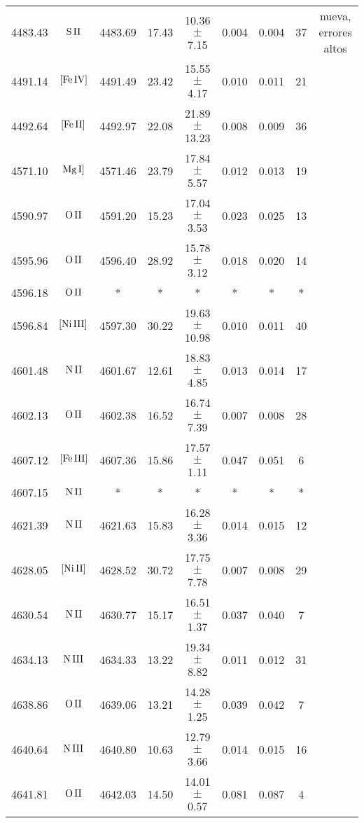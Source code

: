 \documentclass{article}
\begin{document}
\begin{table*}
\begin{adjustbox}{width=\textwidth}
\begin{tabular}{ccccccccc}
4483.43 & $\mbox{S}\thinspace \mbox{II}$ & 4483.69 & 17.43 & 10.36 $\pm$ 7.15 & 0.004 & 0.004 & 37 &  nueva, errores altos \\
4491.14 & $\mbox{[Fe}\thinspace \mbox{IV]}$ & 4491.49 & 23.42 & 15.55 $\pm$ 4.17 & 0.010 & 0.011 & 21 &  \\
4492.64 & $\mbox{[Fe}\thinspace \mbox{II]}$ & 4492.97 & 22.08 & 21.89 $\pm$ 13.23 & 0.008 & 0.009 & 36 &  \\
4571.10 & $\mbox{Mg}\thinspace \mbox{I]}$ & 4571.46 & 23.79 & 17.84 $\pm$ 5.57 & 0.012 & 0.013 & 19 &  \\
4590.97 & $\mbox{O}\thinspace \mbox{II}$ & 4591.20 & 15.23 & 17.04 $\pm$ 3.53 & 0.023 & 0.025 & 13 &  \\
4595.96 & $\mbox{O}\thinspace \mbox{II}$ & 4596.40 & 28.92 & 15.78 $\pm$ 3.12 & 0.018 & 0.020 & 14 &  \\
4596.18 & $\mbox{O}\thinspace \mbox{II}$ & * & * & * & * & * & * &  \\
4596.84 & $\mbox{[Ni}\thinspace \mbox{III]}$ & 4597.30 & 30.22 & 19.63 $\pm$ 10.98 & 0.010 & 0.011 & 40 &  \\
4601.48 & $\mbox{N}\thinspace \mbox{II}$ & 4601.67 & 12.61 & 18.83 $\pm$ 4.85 & 0.013 & 0.014 & 17 &  \\
4602.13 & $\mbox{O}\thinspace \mbox{II}$ & 4602.38 & 16.52 & 16.74 $\pm$ 7.39 & 0.007 & 0.008 & 28 &  \\
4607.12 & $\mbox{[Fe}\thinspace \mbox{III]}$ & 4607.36 & 15.86 & 17.57 $\pm$ 1.11 & 0.047 & 0.051 & 6 &  \\
4607.15 & $\mbox{N}\thinspace \mbox{II}$ & * & * & * & * & * & * &  \\
4621.39 & $\mbox{N}\thinspace \mbox{II}$ & 4621.63 & 15.83 & 16.28 $\pm$ 3.36 & 0.014 & 0.015 & 12 &  \\
4628.05 & $\mbox{[Ni}\thinspace \mbox{II]}$ & 4628.52 & 30.72 & 17.75 $\pm$ 7.78 & 0.007 & 0.008 & 29 &  \\
4630.54 & $\mbox{N}\thinspace \mbox{II}$ & 4630.77 & 15.17 & 16.51 $\pm$ 1.37 & 0.037 & 0.040 & 7 &  \\
4634.13 & $\mbox{N}\thinspace \mbox{III}$ & 4634.33 & 13.22 & 19.34 $\pm$ 8.82 & 0.011 & 0.012 & 31 &  \\
4638.86 & $\mbox{O}\thinspace \mbox{II}$ & 4639.06 & 13.21 & 14.28 $\pm$ 1.25 & 0.039 & 0.042 & 7 &  \\
4640.64 & $\mbox{N}\thinspace \mbox{III}$ & 4640.80 & 10.63 & 12.79 $\pm$ 3.66 & 0.014 & 0.015 & 16 &  \\
4641.81 & $\mbox{O}\thinspace \mbox{II}$ & 4642.03 & 14.50 & 14.01 $\pm$ 0.57 & 0.081 & 0.087 & 4 &  \\

\end{tabular}
\end{adjustbox}
\end{table*}
\end{document}

